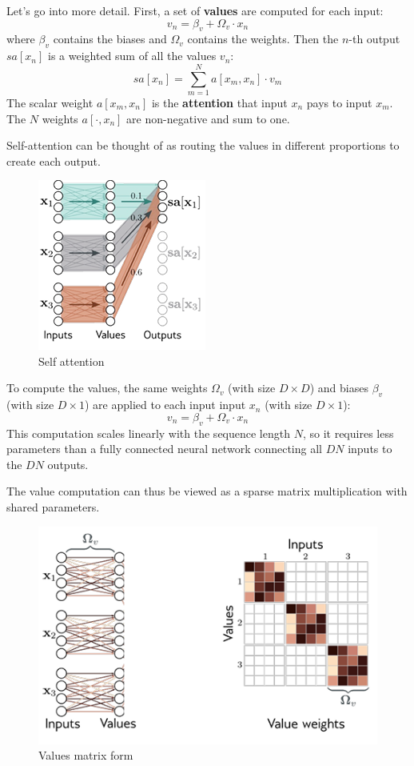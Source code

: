 Let's go into 
more detail. First, a set of \textbf{values} are computed for each input:
\begin{equation}
    v_n = \beta_v + \Omega_v \cdot x_n
\end{equation}
where $\beta_v$ contains the biases and $\Omega_v$ contains the weights. Then the $n$-th output $sa[x_n]$ is a weighted 
sum of all the values $v_n$:
\begin{equation}
    sa[x_n] = \sum_{m = 1}^N a[x_m, x_n] \cdot v_m
\end{equation}
The scalar weight $a[x_m, x_n]$ is the \textbf{attention} that input $x_n$ pays to input $x_m$. The $N$ weights $a[\cdot 
    , x_n]$ are non-negative and sum to one. 

Self-attention can be thought of as routing the values in different proportions to create each output.
\begin{figure}[!ht]
    \centering
    \includegraphics[width=0.3\linewidth]{img/transformer/selfattention.png}
    \caption{Self attention}
    \label{fig:values}
\end{figure}

To compute the values, the same weights $\Omega_v$ (with size $D \times D$) and biases $\beta_v$ (with size $D \times 1$)
are applied to each input input $x_n$ (with size $D \times 1$):
\begin{equation}
    v_n = \beta_v + \Omega_v \cdot x_n
\end{equation}
This computation scales linearly with the sequence length $N$, so it requires less parameters than a fully connected 
neural network connecting all $DN$ inputs to the $DN$ outputs. 

The value computation can thus be viewed as a sparse matrix multiplication with shared parameters.
\begin{figure}[!ht]
    \centering
    \includegraphics[width=0.5\linewidth]{img/transformer/values.png}
    \caption{Values matrix form}
    \label{fig:enter-label}
\end{figure}

